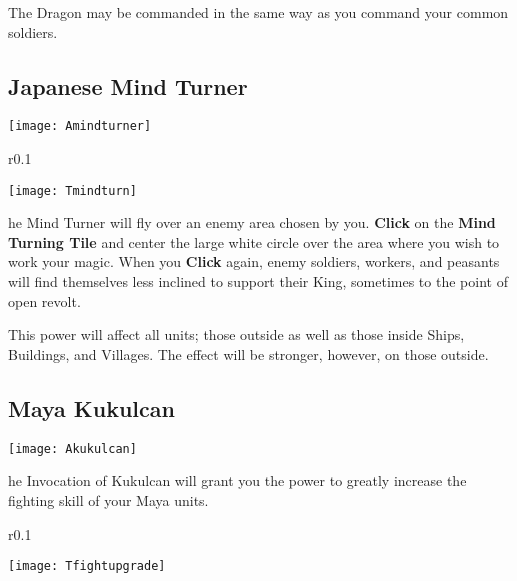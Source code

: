 The Dragon may be commanded in the same way as you command your common soldiers.

\subsection{\textsf{Japanese Mind Turner}}


\begin{center}
    \texttt{[image: Amindturner]}
\end{center}

\begin{wrapfigure}{r}{0.1\textwidth}
    \vspace{-20pt}
    \begin{center}
        \texttt{[image: Tmindturn]}
    \end{center}
    \vspace{-20pt}
\end{wrapfigure}

he Mind Turner will fly over an enemy area chosen by you. \textbf{Click} on the \textbf{Mind Turning Tile} and center the large white circle over the area where you wish to work your magic. When you \textbf{Click} again, enemy soldiers, workers, and peasants will find themselves less inclined to support their King, sometimes to the point of open revolt.

This power will affect all units; those outside as well as those inside Ships, Buildings, and Villages. The effect will be stronger, however, on those outside.

\subsection{\textsf{Maya Kukulcan}}


\begin{center}
    \texttt{[image: Akukulcan]}
\end{center}

he Invocation of Kukulcan will grant you the power to greatly increase the fighting skill of your Maya units.

\begin{wrapfigure}{r}{0.1\textwidth}
    \vspace{-20pt}
    \begin{center}
        \texttt{[image: Tfightupgrade]}
    \end{center}
    \vspace{-20pt}
\end{wrapfigure}

